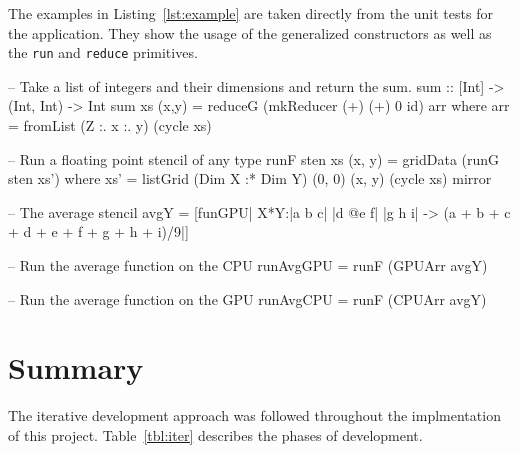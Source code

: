 \documentclass[12pt,a4paper,twoside]{scrbook}
\begin{document}
The examples in Listing~\ref{lst:example} are taken directly from the unit tests
for the application. They show the usage of the generalized constructors as well
as the \texttt{run} and \texttt{reduce} primitives.

\begin{hflisting}[label=lst:example,
caption=Usage of the final system taken from the unit tests.]

-- Take a list of integers and their dimensions and return the sum.
sum :: [Int] -> (Int, Int) -> Int
sum xs (x,y) =  reduceG (mkReducer (+) (+) 0 id) arr
    where arr = fromList (Z :. x :. y) (cycle xs)

-- Run a floating point stencil of any type
runF sten xs (x, y) = gridData (runG sten xs')
    where xs' = listGrid (Dim X :* Dim Y)
                         (0, 0) (x, y)
                         (cycle xs)
                         mirror

-- The average stencil
avgY = [funGPU| X*Y:|a  b c|
                    |d @e f|
                    |g  h i| ->
        (a + b + c + d + e + f + g + h + i)/9|]

-- Run the average function on the CPU
runAvgGPU = runF (GPUArr avgY)

-- Run the average function on the GPU
runAvgCPU = runF (CPUArr avgY)

\end{hflisting}

\section{Summary}

The iterative development approach was followed throughout the implmentation of this project. Table~\ref{tbl:iter} describes the phases of development.
\end{document}
